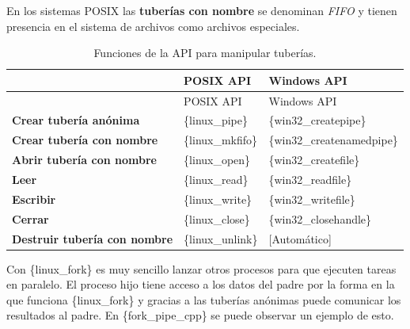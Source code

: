 En los sistemas POSIX las \textbf{tuberías con nombre} se denominan
\emph{FIFO} y tienen presencia en el sistema de archivos como archivos
especiales.

\begin{longtable}[]{@{}
  >{\raggedright\arraybackslash}p{}
  >{\raggedright\arraybackslash}p{}
  >{\raggedright\arraybackslash}p{}@{}}
\caption{Funciones de la API para manipular tuberías.}\tabularnewline
\toprule\noalign{}
\begin{minipage}[b]{\linewidth}\raggedright
\end{minipage} & \begin{minipage}[b]{\linewidth}\raggedright
POSIX API
\end{minipage} & \begin{minipage}[b]{\linewidth}\raggedright
Windows API
\end{minipage} \\
\midrule\noalign{}
\endfirsthead
\toprule\noalign{}
\begin{minipage}[b]{\linewidth}\raggedright
\end{minipage} & \begin{minipage}[b]{\linewidth}\raggedright
POSIX API
\end{minipage} & \begin{minipage}[b]{\linewidth}\raggedright
Windows API
\end{minipage} \\
\midrule\noalign{}
\endhead
\bottomrule\noalign{}
\endlastfoot
\textbf{Crear tubería anónima} & \{linux\_pipe\} &
\{win32\_createpipe\} \\
\textbf{Crear tubería con nombre} & \{linux\_mkfifo\} &
\{win32\_createnamedpipe\} \\
\textbf{Abrir tubería con nombre} & \{linux\_open\} &
\{win32\_createfile\} \\
\textbf{Leer} & \{linux\_read\} & \{win32\_readfile\} \\
\textbf{Escribir} & \{linux\_write\} & \{win32\_writefile\} \\
\textbf{Cerrar} & \{linux\_close\} & \{win32\_closehandle\} \\
\textbf{Destruir tubería con nombre} & \{linux\_unlink\} &
{{[}Automático{]}} \\
\end{longtable}

Con \{linux\_fork\} es muy sencillo lanzar otros procesos para que
ejecuten tareas en paralelo. El proceso hijo tiene acceso a los datos
del padre por la forma en la que funciona \{linux\_fork\} y gracias a
las tuberías anónimas puede comunicar los resultados al padre. En
\{fork\_pipe\_cpp\} se puede observar un ejemplo de esto.

